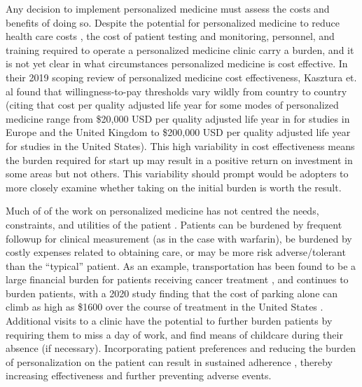 Any decision to implement personalized medicine must assess the costs and benefits of doing so. Despite the potential for personalized medicine to reduce health care costs \cite{looff2016economic,shabaruddin2015economic}, the cost of patient testing and monitoring, personnel, and training required to operate a personalized medicine clinic carry a burden, and it is not yet clear in what circumstances personalized medicine is cost effective.  In their 2019 scoping review of personalized medicine cost effectiveness, Kasztura et. al \cite{kasztura2019cost} found that willingness-to-pay thresholds vary wildly from country to country (citing that cost per quality adjusted life year for some modes of personalized medicine range from \$20,000 USD per quality adjusted life year in for studies in Europe and the United Kingdom to \$200,000 USD per quality adjusted life year for studies in the United States).  This high variability in cost effectiveness means the burden required for start up may result in a positive return on investment in some areas but not others. This variability should prompt would be adopters to more closely examine whether taking on the initial burden is worth the result.

Much of of the work on personalized medicine has not centred the needs, constraints, and utilities of the patient \cite{rogowski2015concepts, di2017personalized}. Patients can be burdened by frequent followup for clinical measurement (as in the case with warfarin), be burdened by costly expenses related to obtaining care, or may be more risk adverse/tolerant than the ``typical'' patient. As an example, transportation has been found to be a large financial burden for patients receiving cancer treatment \cite{houts1984nonmedical}, and continues to burden patients, with a 2020 study finding that the cost of parking alone can climb as high as \$1600 over the course of treatment in the United States \cite{lee2020assessment}.  Additional visits to a clinic have the potential to further burden patients by requiring them to miss a day of work, and find means of childcare during their absence (if necessary). Incorporating patient preferences and reducing the burden of personalization on the patient can result in sustained adherence \cite{elliott2008understanding}, thereby increasing effectiveness and further preventing adverse events.

